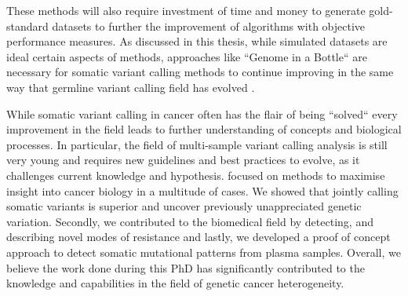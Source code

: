 These methods will also require  investment of time and money to generate gold-standard datasets to further the improvement of algorithms with objective performance measures. As discussed in this thesis, while simulated datasets are ideal  certain aspects of methods, approaches like ``Genome in a Bottle`` are necessary for somatic variant calling methods to continue improving in the same way that  germline variant calling field has evolved \cite{ValleInclan2022}.

While somatic variant calling in cancer often has the flair of being ``solved`` every improvement in the field leads to further understanding of concepts and biological processes. In particular, the field of multi-sample variant calling analysis is still very young and requires new guidelines and best practices to evolve, as it challenges current knowledge and hypothesis.  focused on methods to maximise insight into cancer biology in a multitude of cases. We showed that jointly calling somatic variants is superior and  uncover previously unappreciated genetic variation. Secondly, we contributed to the biomedical field by detecting, and describing novel modes of resistance and lastly, we developed a proof of concept approach to detect somatic mutational patterns from plasma samples. Overall, we believe the work done during this PhD has significantly contributed to the knowledge and capabilities in the field of genetic cancer heterogeneity.

